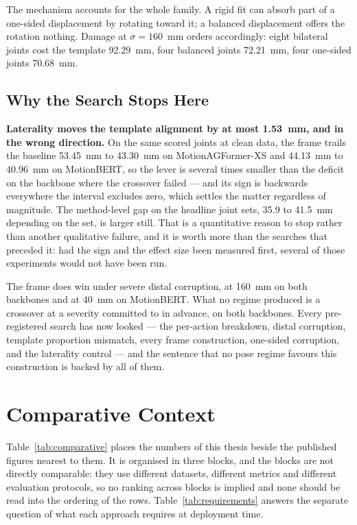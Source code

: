 \documentclass[12pt,a4paper]{report}
\begin{document}
The mechanism accounts for the whole family. A rigid fit can absorb part of a
one-sided displacement by rotating toward it; a balanced displacement offers the
rotation nothing. Damage at $\sigma = 160$~mm orders accordingly: eight bilateral
joints cost the template 92.29~mm, four balanced joints 72.21~mm, four one-sided
joints 70.68~mm.

\subsection{Why the Search Stops Here}

\textbf{Laterality moves the template alignment by at most 1.53~mm, and in the
wrong direction.} On the same scored joints at clean data, the frame trails the baseline
53.45~mm to 43.30~mm on MotionAGFormer-XS and 44.13~mm to 40.96~mm on
MotionBERT, so the lever is several times smaller than the deficit on the
backbone where the crossover failed --- and its sign is backwards everywhere the
interval excludes zero, which settles the matter regardless of magnitude. The method-level gap on
the headline joint sets, 35.9 to 41.5~mm depending on the set, is larger still.
That is a quantitative reason to stop rather than another qualitative failure,
and it is worth more than the searches that preceded it: had the sign and the
effect size been measured first, several of those experiments would not have
been run.

The frame does win under severe distal corruption, at 160~mm on both backbones
and at 40~mm on MotionBERT. What no regime produced is a crossover at a severity
committed to in advance, on both backbones. Every pre-registered search has now
looked --- the per-action breakdown, distal corruption, template proportion
mismatch, every frame construction, one-sided corruption, and the laterality
control --- and the sentence that no pose regime favours this construction is
backed by all of them.

\newpage
\section{Comparative Context}
\label{sec:comparative}

Table~\ref{tab:comparative} places the numbers of this thesis beside the published
figures nearest to them. It is organised in three blocks, and the blocks are not
directly comparable: they use different datasets, different metrics and different
evaluation protocols, so no ranking across blocks is implied and none should be read
into the ordering of the rows. Table~\ref{tab:requirements} answers the separate
question of what each approach requires at deployment time.
\end{document}

